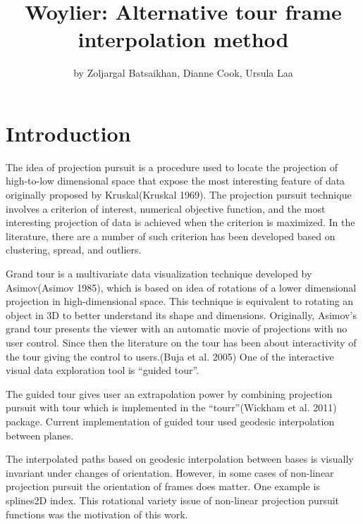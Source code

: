 \title{Woylier: Alternative tour frame interpolation method}
\author{by Zoljargal Batsaikhan, Dianne Cook, Ursula Laa}

\maketitle


\hypertarget{introduction}{%
\section{Introduction}\label{introduction}}

The idea of projection pursuit is a procedure used to locate the projection of high-to-low dimensional space that expose the most interesting feature of data originally proposed by Kruskal(Kruskal 1969). The projection pursuit technique involves a criterion of interest, numerical objective function, and the most interesting projection of data is achieved when the criterion is maximized. In the literature, there are a number of such criterion has been developed based on clustering, spread, and outliers.

Grand tour is a multivariate data visualization technique developed by Asimov(Asimov 1985), which is based on idea of rotations of a lower dimensional projection in high-dimensional space. This technique is equivalent to rotating an object in 3D to better understand its shape and dimensions. Originally, Asimov's grand tour presents the viewer with an automatic movie of projections with no user control. Since then the literature on the tour has been about interactivity of the tour giving the control to users.(Buja et al. 2005) One of the interactive visual data exploration tool is ``guided tour''.

The guided tour gives user an extrapolation power by combining projection pursuit with tour which is implemented in the ``tourr''(Wickham et al. 2011) package. Current implementation of guided tour used geodesic interpolation between planes.

The interpolated paths based on geodesic interpolation between bases is visually invariant under changes of orientation. However, in some cases of non-linear projection pursuit the orientation of frames does matter. One example is splines2D index. This rotational variety issue of non-linear projection pursuit functions was the motivation of this work.

